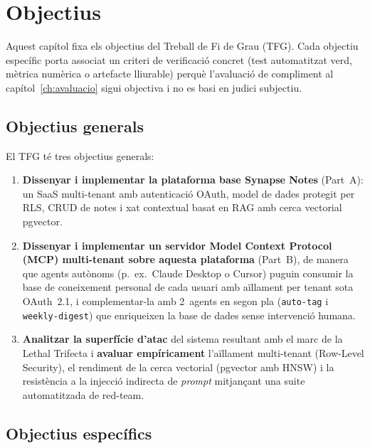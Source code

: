 \chapter{Objectius}
\label{ch:objectius}

Aquest capítol fixa els objectius del Treball de Fi de Grau (TFG). Cada
objectiu específic porta associat un criteri de verificació concret (test
automatitzat verd, mètrica numèrica o artefacte lliurable) perquè
l'avaluació de compliment al capítol~\ref{ch:avaluacio} sigui objectiva i no
es basi en judici subjectiu.

\section{Objectius generals}
\label{sec:objectius-generals}

El TFG té tres objectius generals:

\begin{enumerate}
  \item \textbf{Dissenyar i implementar la plataforma base Synapse
    Notes} (Part~A): un SaaS multi-tenant amb autenticació OAuth,
    model de dades protegit per RLS, CRUD de notes i xat contextual
    basat en RAG amb cerca vectorial pgvector.

  \item \textbf{Dissenyar i implementar un servidor Model Context
    Protocol (MCP) multi-tenant sobre aquesta plataforma} (Part~B),
    de manera que agents autònoms (p.~ex.\ Claude Desktop o Cursor)
    puguin consumir la base de coneixement personal de cada usuari
    amb aïllament per tenant sota OAuth~2.1, i complementar-la amb
    2~agents en segon pla (\texttt{auto-tag} i \texttt{weekly-digest})
    que enriqueixen la base de dades sense intervenció humana.

  \item \textbf{Analitzar la superfície d'atac} del sistema resultant
    amb el marc de la Lethal Trifecta
    \autocite{willison2025trifecta} i \textbf{avaluar empíricament}
    l'aïllament multi-tenant (Row-Level Security), el rendiment de
    la cerca vectorial (pgvector amb HNSW) i la resistència a la
    injecció indirecta de \emph{prompt} mitjançant una suite
    automatitzada de red-team.
\end{enumerate}

\section{Objectius específics}
\label{sec:objectius-especifics}

